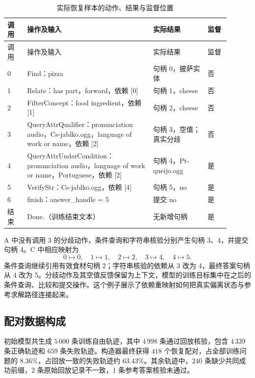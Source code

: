 \begin{longtable}{@{}p{0.08\linewidth}p{0.51\linewidth}p{0.22\linewidth}p{0.09\linewidth}@{}}
\caption{实际恢复样本的动作、结果与监督位置}\label{tab:recovery-example}\\
\toprule
调用 & 操作及输入 & 实际结果 & 监督\\
\midrule
\endfirsthead
\toprule
调用 & 操作及输入 & 实际结果 & 监督\\
\midrule
\endhead
0 & Find：pizza & 句柄 0，披萨实体 & 否\\
1 & Relate：has part，forward，依赖 [0] & 句柄 1，cheese & 否\\
2 & FilterConcept：food ingredient，依赖 [1] & 句柄 2，cheese & 否\\
3 & QueryAttrQualifier：pronunciation audio，Cs-jablko.ogg，language of work or name，依赖 [2] & 句柄 3，空值；真实分歧 & 否\\
4 & QueryAttrUnderCondition：pronunciation audio，language of work or name，Portuguese，依赖 [2] & 句柄 4，Pt-queijo.ogg & 是\\
5 & VerifyStr：Cs-jablko.ogg，依赖 [4] & 句柄 5，no & 是\\
6 & finish：answer\_handle = 5 & 提交 no & 是\\
结束 & Done.（训练结束文本） & 无新增句柄 & 是\\
\bottomrule
\end{longtable}

A 中没有调用 3 的分歧动作，条件查询和字符串核验分别产生句柄 3、4，并提交句柄 4。C 中相应映射为
\begin{equation}
  0\mapsto0,\quad1\mapsto1,\quad2\mapsto2,\quad
  3\mapsto4,\quad4\mapsto5.
\end{equation}
条件查询继续引用有效食材句柄 2；字符串核验的依赖从 3 改为 4，最终答案句柄从 4 改为 5。分歧动作及其空值反馈保留为上下文，模型的训练目标集中在之后的条件查询、比较和提交操作。这个例子展示了依赖重映射如何把真实偏离状态与参考求解路径连接起来。

\subsection{配对数据构成}

初始模型共生成 $5\,000$ 条训练自由轨迹，其中 $4\,998$ 条通过回放核验，包含 $4\,339$ 条正确轨迹和 $659$ 条失败轨迹。构造器最终获得 $418$ 个恢复配对，占全部训练问题的 $8.36\%$，占回放一致的失败轨迹约 $63.43\%$。其余轨迹中，$240$ 条缺少共同成功前缀，$2$ 条原始回放记录不一致，$1$ 条参考答案核验未通过。

